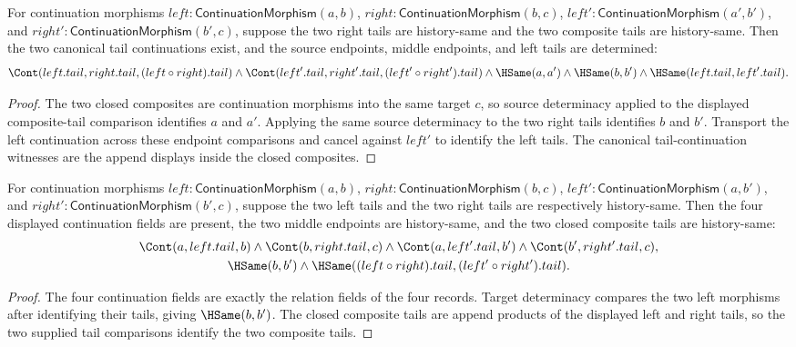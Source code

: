 \begin{theorem}
\label{thm:continuation-morphism-comp-same-right-tail-factorization-deterministic}
For continuation morphisms
$left:\mathsf{ContinuationMorphism}(a,b)$,
$right:\mathsf{ContinuationMorphism}(b,c)$,
$left':\mathsf{ContinuationMorphism}(a',b')$, and
$right':\mathsf{ContinuationMorphism}(b',c)$, suppose the two right tails are
history-same and the two composite tails are history-same. Then the two
canonical tail continuations exist, and the source endpoints, middle endpoints,
and left tails are determined:
$$
\Cont(left.tail,right.tail,(left\circ right).tail)\wedge
\Cont(left'.tail,right'.tail,(left'\circ right').tail)\wedge
\HSame(a,a')\wedge\HSame(b,b')\wedge\HSame(left.tail,left'.tail).
$$
\end{theorem}
\begin{proof}
The two closed composites are continuation morphisms into the same target
$c$, so source determinacy applied to the displayed composite-tail comparison
identifies $a$ and $a'$. Applying the same source determinacy to the two right
tails identifies $b$ and $b'$. Transport the left continuation across these
endpoint comparisons and cancel against $left'$ to identify the left tails.
The canonical tail-continuation witnesses are the append displays inside the
closed composites.
\end{proof}

\begin{theorem}
\label{thm:continuation-morphism-parallel-factor-comp-tail-middle-deterministic}
For continuation morphisms
$left:\mathsf{ContinuationMorphism}(a,b)$,
$right:\mathsf{ContinuationMorphism}(b,c)$,
$left':\mathsf{ContinuationMorphism}(a,b')$, and
$right':\mathsf{ContinuationMorphism}(b',c)$, suppose the two left tails and
the two right tails are respectively history-same. Then the four displayed
continuation fields are present, the two middle endpoints are history-same, and
the two closed composite tails are history-same:
$$
\begin{gathered}
\Cont(a,left.tail,b)\wedge\Cont(b,right.tail,c)\wedge
\Cont(a,left'.tail,b')\wedge\Cont(b',right'.tail,c),\\
\HSame(b,b')\wedge
\HSame((left\circ right).tail,(left'\circ right').tail).
\end{gathered}
$$
\end{theorem}
\begin{proof}
The four continuation fields are exactly the relation fields of the four
records. Target determinacy compares the two left morphisms after identifying
their tails, giving $\HSame(b,b')$. The closed composite tails are append
products of the displayed left and right tails, so the two supplied tail
comparisons identify the two composite tails.
\end{proof}

